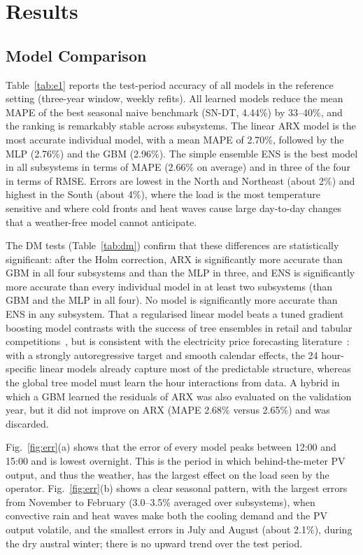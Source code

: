 \section{Results}
\label{sec:results}

\subsection{Model Comparison}
\label{sec:res_main}
Table~\ref{tab:e1} reports the test-period accuracy of all models in the reference setting (three-year window, weekly refits). All learned models reduce the mean MAPE of the best seasonal naive benchmark (SN-DT, 4.44\%) by 33--40\%, and the ranking is remarkably stable across subsystems. The linear ARX model is the most accurate individual model, with a mean MAPE of 2.70\%, followed by the MLP (2.76\%) and the GBM (2.96\%). The simple ensemble ENS is the best model in all subsystems in terms of MAPE (2.66\% on average) and in three of the four in terms of RMSE. Errors are lowest in the North and Northeast (about 2\%) and highest in the South (about 4\%), where the load is the most temperature sensitive and where cold fronts and heat waves cause large day-to-day changes that a weather-free model cannot anticipate.

The DM tests (Table~\ref{tab:dm}) confirm that these differences are statistically significant: after the Holm correction, ARX is significantly more accurate than GBM in all four subsystems and than the MLP in three, and ENS is significantly more accurate than every individual model in at least two subsystems (than GBM and the MLP in all four). No model is significantly more accurate than ENS in any subsystem. That a regularised linear model beats a tuned gradient boosting model contrasts with the success of tree ensembles in retail and tabular competitions~\cite{makridakis2022m5,grinsztajn2022tabular}, but is consistent with the electricity price forecasting literature~\cite{lago2021benchmark}: with a strongly autoregressive target and smooth calendar effects, the 24 hour-specific linear models already capture most of the predictable structure, whereas the global tree model must learn the hour interactions from data. A hybrid in which a GBM learned the residuals of ARX was also evaluated on the validation year, but it did not improve on ARX (MAPE 2.68\% versus 2.65\%) and was discarded.

Fig.~\ref{fig:err}(a) shows that the error of every model peaks between 12:00 and 15:00 and is lowest overnight. This is the period in which behind-the-meter PV output, and thus the weather, has the largest effect on the load seen by the operator. Fig.~\ref{fig:err}(b) shows a clear seasonal pattern, with the largest errors from November to February (3.0--3.5\% averaged over subsystems), when convective rain and heat waves make both the cooling demand and the PV output volatile, and the smallest errors in July and August (about 2.1\%), during the dry austral winter; there is no upward trend over the test period.

